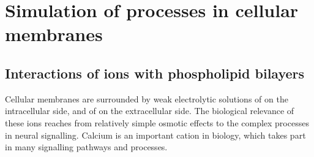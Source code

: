 \documentclass[12pt,a4paper,twoside,openright]{report}
\begin{document}
\newpage



\tableofcontents



\newpage











\chapter*{Simulation of processes in cellular membranes}



\section*{Interactions of ions with phospholipid bilayers}

Cellular membranes are surrounded by 
weak electrolytic solutions of  on the intracellular side, 
and of  on the extracellular side. 
The biological relevance of these ions reaches from relatively simple osmotic effects to the complex processes in neural signalling. \citep{Knudsen_book2002} 
Calcium is an important cation in biology, 
which takes part in many signalling pathways and processes. 
\end{document}

